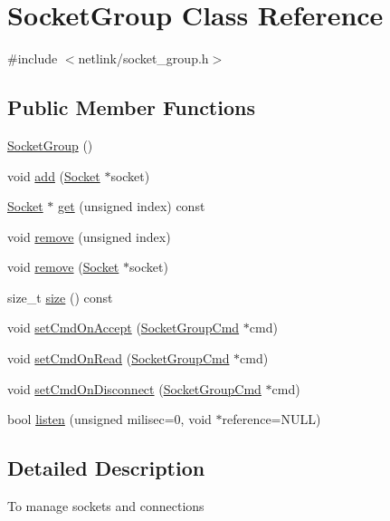\hypertarget{classSocketGroup}{}\section{Socket\+Group Class Reference}
\label{classSocketGroup}


{\ttfamily \#include $<$netlink/socket\+\_\+group.\+h$>$}

\subsection*{Public Member Functions}
\begin{DoxyCompactItemize}
\item 
\hyperlink{classSocketGroup_a23c671bf0c253701cef0986b34291fe6}{Socket\+Group} ()
\item 
void \hyperlink{classSocketGroup_ad91d0c0cd4b6bcd1332601069606d4ae}{add} (\hyperlink{classSocket}{Socket} $\ast$socket)
\item 
\hyperlink{classSocket}{Socket} $\ast$ \hyperlink{classSocketGroup_ae7a3f085186b16704ed0164ac15c2b11}{get} (unsigned index) const 
\item 
void \hyperlink{classSocketGroup_a5bda6446d3e445074b6d7c51d09676fb}{remove} (unsigned index)
\item 
void \hyperlink{classSocketGroup_aa03841a8978bbaa6223f11b994f42d90}{remove} (\hyperlink{classSocket}{Socket} $\ast$socket)
\item 
size\+\_\+t \hyperlink{classSocketGroup_ac4ac6b4eb65b035c9ec4537addff280a}{size} () const 
\item 
void \hyperlink{classSocketGroup_ae7bcb82ccd1ec59b9ae085d766ca3517}{set\+Cmd\+On\+Accept} (\hyperlink{classSocketGroupCmd}{Socket\+Group\+Cmd} $\ast$cmd)
\item 
void \hyperlink{classSocketGroup_a59263bbbe8db11dd12874ce41766cd4a}{set\+Cmd\+On\+Read} (\hyperlink{classSocketGroupCmd}{Socket\+Group\+Cmd} $\ast$cmd)
\item 
void \hyperlink{classSocketGroup_a840d702bc1448f15c1d14a2e79137164}{set\+Cmd\+On\+Disconnect} (\hyperlink{classSocketGroupCmd}{Socket\+Group\+Cmd} $\ast$cmd)
\item 
bool \hyperlink{classSocketGroup_a7991c19d8fd2e08e5deab0605917b47e}{listen} (unsigned milisec=0, void $\ast$reference=N\+U\+L\+L)
\end{DoxyCompactItemize}


\subsection{Detailed Description}
To manage sockets and connections 

